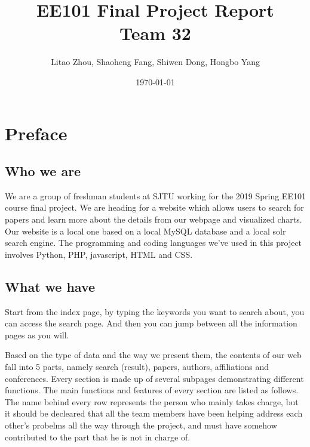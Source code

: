 \documentclass{book}
\begin{document}
\title{EE101 Final Project Report \\ Team 32}
\author{ Litao Zhou, Shaoheng Fang, Shiwen Dong, Hongbo Yang}

\date{\today}




\maketitle


\tableofcontents


\frontmatter

\chapter {Preface}

\section* {Who we are}

We are a group of freshman students at SJTU working for the 2019 Spring EE101 course final project. We are heading for a website which allows users to search for papers and learn more about the details from our webpage and visualized charts. Our website is a local one based on a local MySQL database and a local solr search engine. The programming and coding languages we've used in this project involves Python, PHP, javascript, HTML and CSS.

\section* {What we have}


Start from the index page, by typing the keywords you want to search about, you can access the search page. And then you can jump between all the information pages as you will. 

Based on the type of data and the way we present them, the contents of our web fall into 5 parts, namely search (result), papers, authors, affiliations and conferences. Every section is made up of several subpages demonstrating different functions. The main functions and features of every section are listed as follows. The name behind every row represents the person who mainly takes charge, but it should be decleared that all the team members have been helping address each other's probelms all the way through the project, and must have somehow contributed to the part that he is not in charge of.
\end{document}
